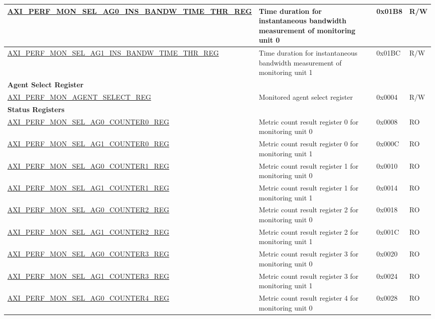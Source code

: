 \begin{longtable}{ | p{9.1cm} | p{5cm} | p{1.3cm} | p{1.4cm} | }
\hyperref[regdesc:AXIPERFMONSELAGNINSBANDWTIMETHRREG]{AXI\_PERF\_MON\_SEL\_AG0\_INS\_BANDW\_TIME\_THR\_REG} & Time duration for instantaneous bandwidth measurement of monitoring unit 0 & 0x01B8 & R/W\\ \hline
\hyperref[regdesc:AXIPERFMONSELAGNINSBANDWTIMETHRREG]{AXI\_PERF\_MON\_SEL\_AG1\_INS\_BANDW\_TIME\_THR\_REG} & Time duration for instantaneous bandwidth measurement of monitoring unit 1 & 0x01BC & R/W\\ \hline
\multicolumn{4}{|l|}{\textbf{Agent Select Register}} \\ \hline
\hyperref[regdesc:AXIPERFMONAGENTSELECTREG]{AXI\_PERF\_MON\_AGENT\_SELECT\_REG} & Monitored agent select register & 0x0004 & R/W\\ \hline
\multicolumn{4}{|l|}{\textbf{Status Registers}} \\ \hline
\hyperref[regdesc:AXIPERFMONSELAGNCOUNTERMREG]{AXI\_PERF\_MON\_SEL\_AG0\_COUNTER0\_REG} & Metric count result register 0 for monitoring unit 0 & 0x0008 & RO\\ \hline
\hyperref[regdesc:AXIPERFMONSELAGNCOUNTERMREG]{AXI\_PERF\_MON\_SEL\_AG1\_COUNTER0\_REG} & Metric count result register 0 for monitoring unit 1 & 0x000C & RO\\ \hline
\hyperref[regdesc:AXIPERFMONSELAGNCOUNTERMREG]{AXI\_PERF\_MON\_SEL\_AG0\_COUNTER1\_REG} & Metric count result register 1 for monitoring unit 0 & 0x0010 & RO\\ \hline
\hyperref[regdesc:AXIPERFMONSELAGNCOUNTERMREG]{AXI\_PERF\_MON\_SEL\_AG1\_COUNTER1\_REG} & Metric count result register 1 for monitoring unit 1 & 0x0014 & RO\\ \hline
\hyperref[regdesc:AXIPERFMONSELAGNCOUNTERMREG]{AXI\_PERF\_MON\_SEL\_AG0\_COUNTER2\_REG} & Metric count result register 2 for monitoring unit 0 & 0x0018 & RO\\ \hline
\hyperref[regdesc:AXIPERFMONSELAGNCOUNTERMREG]{AXI\_PERF\_MON\_SEL\_AG1\_COUNTER2\_REG} & Metric count result register 2 for monitoring unit 1 & 0x001C & RO\\ \hline
\hyperref[regdesc:AXIPERFMONSELAGNCOUNTERMREG]{AXI\_PERF\_MON\_SEL\_AG0\_COUNTER3\_REG} & Metric count result register 3 for monitoring unit 0 & 0x0020 & RO\\ \hline
\hyperref[regdesc:AXIPERFMONSELAGNCOUNTERMREG]{AXI\_PERF\_MON\_SEL\_AG1\_COUNTER3\_REG} & Metric count result register 3 for monitoring unit 1 & 0x0024 & RO\\ \hline
\hyperref[regdesc:AXIPERFMONSELAGNCOUNTERMREG]{AXI\_PERF\_MON\_SEL\_AG0\_COUNTER4\_REG} & Metric count result register 4 for monitoring unit 0 & 0x0028 & RO\\ \hline

\end{longtable}
